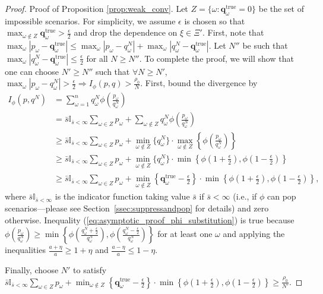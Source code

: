 \documentclass[opre,nonblindrev]{informs3} %
\newcommand{\q}{\mathbf{q}}
\newcommand{\qtrue}{\q^{\text{true}}}
\begin{document}
\begin{proof}{\sc Proof of Proposition \ref{prop:weak_conv}.}
	Let $Z = \{\omega : \qtrue_\omega = 0\}$ be the set of impossible scenarios.
	For simplicity, we assume $\epsilon$ is chosen so that $\max_{\omega \notin Z} \qtrue_\omega > \frac{\epsilon}{2}$ and drop the dependence on $\xi \in \Xi'$.	
	First, note that $\max_\omega |p_\omega - \qtrue_\omega| \leq \max_\omega |p_\omega - q^N_\omega| + \max_\omega |q^N_\omega - \qtrue_\omega|$.
	Let $N''$ be such that $\max_\omega |q^N_\omega - \qtrue_\omega| \leq \frac{\epsilon}{2}$ for all $N \geq N''$.
	To complete the proof, we will show that one can choose $N' \geq N''$ such that $\forall N \geq N'$, $\max_\omega |p_\omega - q^N_\omega| > \frac{\epsilon}{2} \Rightarrow I_\phi(p,q) > \frac{\rho_0}{N}$.
	First, bound the divergence by
	\begin{align}
		I_{\phi}(p,q^N) & = \sum_{\omega=1}^n q^N_\omega \phi\left( \frac{p_\omega}{q^N_\omega} \right) \nonumber \\
		& = \bar{s} \mathbb{I}_{\bar{s} < \infty} \sum_{\omega \in Z} p_\omega + \sum_{\omega \notin Z} q^N_\omega \phi\left( \frac{p_\omega}{q^N_\omega} \right) \nonumber \\
		& \geq \bar{s} \mathbb{I}_{\bar{s} < \infty} \sum_{\omega \in Z} p_\omega + \min_{\omega \notin Z} \{q^N_\omega\} \cdot \max_{\omega \notin Z} \left\{ \phi \left( \frac{p_\omega}{q^N_\omega} \right) \right\} \nonumber \\
		& \geq \bar{s} \mathbb{I}_{\bar{s} < \infty} \sum_{\omega \in Z} p_\omega  + \min_{\omega \notin Z} \{q^N_\omega\} \cdot \min\left\{ \phi\left(1+\frac{\epsilon}{2}\right), \phi\left(1-\frac{\epsilon}{2}\right) \right\} \label{eq:asymptotic_proof_phi_substitution} \\
		& \geq \bar{s} \mathbb{I}_{\bar{s} < \infty} \sum_{\omega \in Z} p_\omega + \min_{\omega \notin Z} \left\{ \qtrue_\omega - \frac{\epsilon}{2} \right\} \cdot \min\left\{ \phi\left(1+\frac{\epsilon}{2}\right), \phi\left(1-\frac{\epsilon}{2}\right) \right\} \nonumber,
	\end{align}
	where $\bar{s}\mathbb{I}_{\bar{s} < \infty}$ is the indicator function taking value $\bar{s}$ if $\bar{s} < \infty$ (i.e., if $\phi$ can pop scenarios---please see Section~\ref{ssec:suppressandpop} for details) and zero otherwise.	
	Inequality (\ref{eq:asymptotic_proof_phi_substitution}) is true because $\phi \left( \frac{p_\omega}{q^N_\omega} \right) \geq \min\left\{ \phi\left( \frac{q^N_\omega+\tfrac{\epsilon}{2}}{q^N_\omega} \right), \phi\left( \frac{q^N_\omega-\tfrac{\epsilon}{2}}{q^N_\omega} \right) \right\}$ for at least one $\omega$ and applying the inequalities $\frac{a+\eta}{a} \geq 1 + \eta$ and $\frac{a-\eta}{a} \leq 1-\eta$.
	
	Finally, choose $N'$ to satisfy $\bar{s} \mathbb{I}_{\bar{s} < \infty} \sum_{\omega \in Z} p_\omega + \min_{\omega \notin Z} \left\{ \qtrue_\omega - \frac{\epsilon}{2} \right\} \cdot \min\left\{ \phi\left(1+\frac{\epsilon}{2}\right), \phi\left(1-\frac{\epsilon}{2}\right) \right\} \geq \frac{\rho_0}{N'}$.
	\Halmos
\end{proof}
\end{document}
